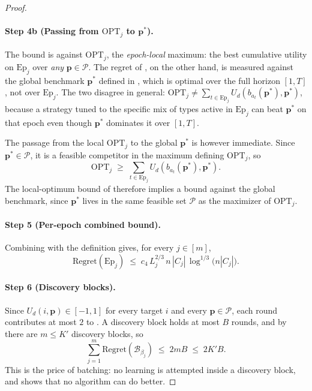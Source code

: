 \documentclass[letterpaper,9pt,twocolumn]{extarticle}
\newcommand{\pvec}{\mathbf{p}}
\newcommand{\cP}{\mathcal{P}}
\newcommand{\cB}{\mathcal{B}}
\newcommand{\Ep}{\mathrm{Ep}}
\newcommand{\Regret}{\mathrm{Regret}}
\theoremstyle{plain}
\theoremstyle{definition}
\theoremstyle{remark}
\begin{document}
\begin{proof}
\paragraph{Step 4b (Passing from $\mathrm{OPT}_j$ to $\pvec^{*}$).}
The bound  is against $\mathrm{OPT}_j$, the
\emph{epoch-local} maximum: the best cumulative utility on $\Ep_j$ over
\emph{any} $\pvec\in\cP$. The regret of , on the
other hand, is measured against the global benchmark $\pvec^{*}$ defined
in , which is optimal over the full horizon $[1,T]$, not
over $\Ep_j$. The two disagree in general:
$\mathrm{OPT}_j\ne\sum_{t\in\Ep_j}U_d(b_{a_t}(\pvec^{*}),\pvec^{*})$,
because a strategy tuned to the specific mix of types active in
$\Ep_j$ can beat $\pvec^{*}$ on that epoch even though $\pvec^{*}$
dominates it over $[1,T]$.

The passage from the local $\mathrm{OPT}_j$ to the global $\pvec^{*}$ is
however immediate. Since $\pvec^{*}\in\cP$, it is a feasible competitor
in the maximum defining $\mathrm{OPT}_j$, so
\begin{equation}
\mathrm{OPT}_j\;\ge\;\sum_{t\in\Ep_j}U_d(b_{a_t}(\pvec^{*}),\pvec^{*}).
\label{eq:opt-vs-pstar-block}
\end{equation}
The local-optimum bound of  therefore implies
a bound against the global benchmark, since $\pvec^{*}$ lives in the
same feasible set $\cP$ as the maximizer of $\mathrm{OPT}_j$.

\paragraph{Step 5 (Per-epoch combined bound).}
Combining  with the
definition  gives, for every $j\in[m]$,
\begin{equation}
\Regret(\Ep_j)\;\le\;c_4\,L_j^{2/3}\,n\,|C_j|\,\log^{1/3}\!\bigl(n|C_j|\bigr).
\label{eq:combined-epoch-block}
\end{equation}

\paragraph{Step 6 (Discovery blocks).}
Since $U_d(i,\pvec)\in[-1,1]$ for every target $i$ and every
$\pvec\in\cP$, each round contributes at most $2$ to
. A discovery block holds at most $B$ rounds, and
by  there are $m\le K'$ discovery blocks, so
\begin{equation}
\sum_{j=1}^{m}\Regret(\cB_{\beta_j})\;\le\;2mB\;\le\;2K'B.
\label{eq:disc-block-sum}
\end{equation}
This is the price of batching: no learning is attempted inside a
discovery block, and  shows that no algorithm can do
better.


\end{proof}
\end{document}
